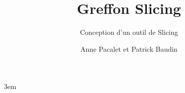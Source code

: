 \documentclass[lang=french]{frama-c-book}
\title{Greffon Slicing}
\subtitle{Conception d'un outil de Slicing}
\author{Anne Pacalet et Patrick Baudin}
\begin{document}
\sloppy
\emergencystretch 3em

\maketitle


\end{document}
